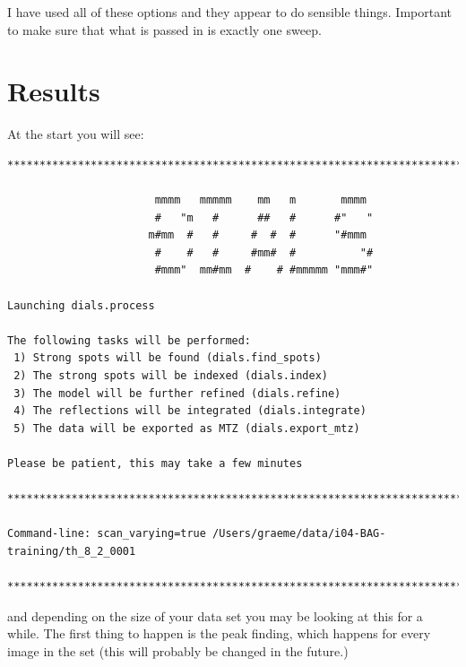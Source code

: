\documentclass[a4paper, 11pt]{article}
\begin{document}
\noindent
I have used all of these options and they appear to do sensible things. Important to make sure that what is passed in is exactly one sweep.

\section{Results}

At the start you will see:

{\small
\begin{verbatim}
********************************************************************************

                       mmmm   mmmmm    mm   m       mmmm            
                       #   "m   #      ##   #      #"   "           
                      m#mm  #   #     #  #  #      "#mmm            
                       #    #   #     #mm#  #          "#           
                       #mmm"  mm#mm  #    # #mmmmm "mmm#"           

Launching dials.process

The following tasks will be performed:
 1) Strong spots will be found (dials.find_spots)
 2) The strong spots will be indexed (dials.index)
 3) The model will be further refined (dials.refine)
 4) The reflections will be integrated (dials.integrate)
 5) The data will be exported as MTZ (dials.export_mtz)

Please be patient, this may take a few minutes

********************************************************************************

Command-line: scan_varying=true /Users/graeme/data/i04-BAG-training/th_8_2_0001

********************************************************************************
\end{verbatim}
}

\noindent
and depending on the size of your data set you may be looking at this
for a while. The first thing to happen is the peak finding, which
happens for every image in the set (this will probably be changed in
the future.)
\end{document}

